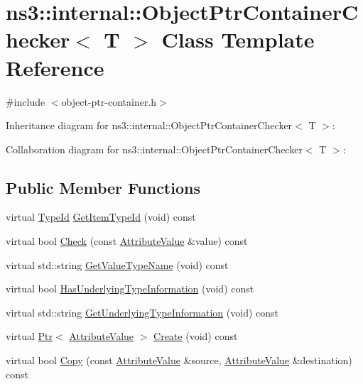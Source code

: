 \hypertarget{classns3_1_1internal_1_1ObjectPtrContainerChecker}{}\section{ns3\+:\+:internal\+:\+:Object\+Ptr\+Container\+Checker$<$ T $>$ Class Template Reference}
\label{classns3_1_1internal_1_1ObjectPtrContainerChecker}


{\ttfamily \#include $<$object-\/ptr-\/container.\+h$>$}



Inheritance diagram for ns3\+:\+:internal\+:\+:Object\+Ptr\+Container\+Checker$<$ T $>$\+:


Collaboration diagram for ns3\+:\+:internal\+:\+:Object\+Ptr\+Container\+Checker$<$ T $>$\+:
\subsection*{Public Member Functions}
\begin{DoxyCompactItemize}
\item 
virtual \hyperlink{classns3_1_1TypeId}{Type\+Id} \hyperlink{classns3_1_1internal_1_1ObjectPtrContainerChecker_a772e8af042f7d22bc0cde4efe6123c89}{Get\+Item\+Type\+Id} (void) const 
\item 
virtual bool \hyperlink{classns3_1_1internal_1_1ObjectPtrContainerChecker_a3395f0d83a76cdff0d9528ad9b6b0f30}{Check} (const \hyperlink{classns3_1_1AttributeValue}{Attribute\+Value} \&value) const 
\item 
virtual std\+::string \hyperlink{classns3_1_1internal_1_1ObjectPtrContainerChecker_a2160373030472b19f12451bf6ce0d462}{Get\+Value\+Type\+Name} (void) const 
\item 
virtual bool \hyperlink{classns3_1_1internal_1_1ObjectPtrContainerChecker_ac6e075b75694e086a4199066d18911ad}{Has\+Underlying\+Type\+Information} (void) const 
\item 
virtual std\+::string \hyperlink{classns3_1_1internal_1_1ObjectPtrContainerChecker_a5e5c6aa34b5e51870f6003fa9694cdb1}{Get\+Underlying\+Type\+Information} (void) const 
\item 
virtual \hyperlink{classns3_1_1Ptr}{Ptr}$<$ \hyperlink{classns3_1_1AttributeValue}{Attribute\+Value} $>$ \hyperlink{classns3_1_1internal_1_1ObjectPtrContainerChecker_ab078e07049a4d366ce53dd04e5ea5565}{Create} (void) const 
\item 
virtual bool \hyperlink{classns3_1_1internal_1_1ObjectPtrContainerChecker_ae80f2341d068b23724f08ccd19cd10ac}{Copy} (const \hyperlink{classns3_1_1AttributeValue}{Attribute\+Value} \&source, \hyperlink{classns3_1_1AttributeValue}{Attribute\+Value} \&destination) const 
\end{DoxyCompactItemize}
